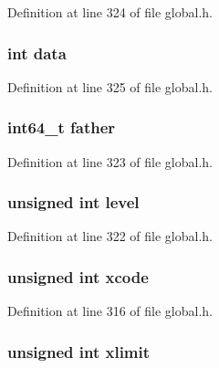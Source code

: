 Definition at line 324 of file global.\-h.

\hypertarget{struct__octNode_a9eab91667db4d35c7231dcddf7b89a76}{
\subsubsection[{data}]{\setlength{\rightskip}{0pt plus 5cm}int data}}\label{struct__octNode_a9eab91667db4d35c7231dcddf7b89a76}


Definition at line 325 of file global.\-h.

\hypertarget{struct__octNode_a01857805a0485a378222abf4cceded07}{
\subsubsection[{father}]{\setlength{\rightskip}{0pt plus 5cm}int64\-\_\-t father}}\label{struct__octNode_a01857805a0485a378222abf4cceded07}


Definition at line 323 of file global.\-h.

\hypertarget{struct__octNode_a9082f945c1d289684d0bcd51ee08e11e}{
\subsubsection[{level}]{\setlength{\rightskip}{0pt plus 5cm}unsigned int level}}\label{struct__octNode_a9082f945c1d289684d0bcd51ee08e11e}


Definition at line 322 of file global.\-h.

\hypertarget{struct__octNode_abf1b4fc0b884c24d8809d956a03e3886}{
\subsubsection[{xcode}]{\setlength{\rightskip}{0pt plus 5cm}unsigned int xcode}}\label{struct__octNode_abf1b4fc0b884c24d8809d956a03e3886}


Definition at line 316 of file global.\-h.

\hypertarget{struct__octNode_abf5a7905067426a571446ca0cc08f4f2}{
\subsubsection[{xlimit}]{\setlength{\rightskip}{0pt plus 5cm}unsigned int xlimit}}\label{struct__octNode_abf5a7905067426a571446ca0cc08f4f2}


